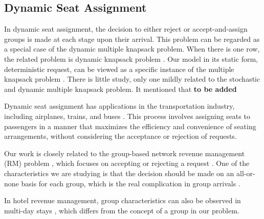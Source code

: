 \subsection{Dynamic Seat Assignment}





In dynamic seat assignment, the decision to either reject or accept-and-assign groups is made at each stage upon their arrival. This problem can be regarded as a special case of the dynamic multiple knapsack problem. When there is one row, the related problem is dynamic knapsack problem \cite{kleywegt1998dynamic}. Our model in its static form, deterministic request, can be viewed as a specific instance of the multiple knapsack problem \cite{pisinger1999exact}. There is little study, only one mildly related to the stochastic and dynamic multiple knapsack problem. It mentioned that {\bf{to be added}}


Dynamic seat assignment has applications in the transportation industry, including airplanes, trains, and buses \cite{hamdouch2011schedule, berge1993demand}. This process involves assigning seats to passengers in a manner that maximizes the efficiency and convenience of seating arrangements, without considering the acceptance or rejection of requests.


Our work is closely related to the group-based network revenue management (RM) problem \cite{williamson1992airline}, which focuses on accepting or rejecting a request \cite{gallego1997multiproduct}. One of the characteristics we are studying is that the decision should be made on an all-or-none basis for each group, which is the real complication in group arrivals \cite{talluri2006theory}. 

In hotel revenue management, group characteristics can also be observed in multi-day stays \cite{aydin2018decomposition, bitran1995application}, which differs from the concept of a group in our problem.

